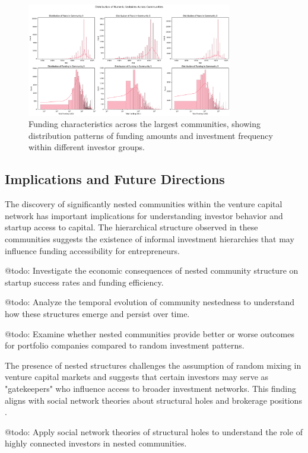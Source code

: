 \documentclass[12pt]{article}
\begin{document}
\begin{figure}[htbp]
\centering
\includegraphics[width=0.8\textwidth]{./assets/funding-characteristics.png}
\caption{Funding characteristics across the largest communities, showing distribution patterns of funding amounts and investment frequency within different investor groups.}
\label{fig:funding_characteristics}
\end{figure}

\subsection{Implications and Future Directions}

The discovery of significantly nested communities within the venture capital network has important implications for understanding investor behavior and startup access to capital. The hierarchical structure observed in these communities suggests the existence of informal investment hierarchies that may influence funding accessibility for entrepreneurs.

@todo: Investigate the economic consequences of nested community structure on startup success rates and funding efficiency.

@todo: Analyze the temporal evolution of community nestedness to understand how these structures emerge and persist over time.

@todo: Examine whether nested communities provide better or worse outcomes for portfolio companies compared to random investment patterns.

The presence of nested structures challenges the assumption of random mixing in venture capital markets and suggests that certain investors may serve as "gatekeepers" who influence access to broader investment networks. This finding aligns with social network theories about structural holes and brokerage positions \cite{Borgatti2011}.

@todo: Apply social network theories of structural holes to understand the role of highly connected investors in nested communities.
\end{document}

